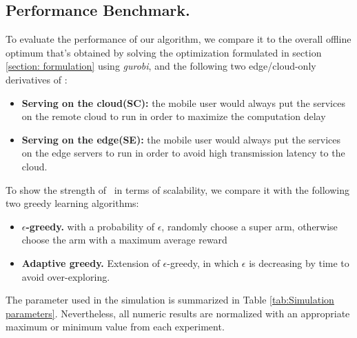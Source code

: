 \subsection{Performance Benchmark.}
To evaluate the performance of our algorithm, we compare it to the overall offline optimum that's obtained by solving the optimization formulated in section \ref{section: formulation} using \textit{gurobi}\cite{gurobi}, and the following two edge/cloud-only derivatives of \myalgorithm:
\begin{itemize}
	\item \textbf{Serving on the cloud(SC):} the mobile user would always put the services on the remote cloud to run in order to maximize the computation delay
	\item \textbf{Serving on the edge(SE):} the mobile user would always put the services on the edge servers to run in order to avoid high transmission latency to the cloud. 
\end{itemize}
To show the strength of \myalgorithm\ in terms of scalability, we compare it with the following two greedy learning algorithms:
\begin{itemize}
	\item \textbf{$\epsilon$-greedy.} with a probability of $\epsilon$, randomly choose a super arm, otherwise choose the arm with a maximum average reward
	\item \textbf{Adaptive greedy.} Extension of $\epsilon$-greedy, in which $\epsilon$ is decreasing by time to avoid over-exploring.
\end{itemize}
The parameter used in the simulation is summarized in Table \ref{tab:Simulation parameters}. Nevertheless,  all numeric results are normalized with an appropriate maximum or minimum value from each experiment.



